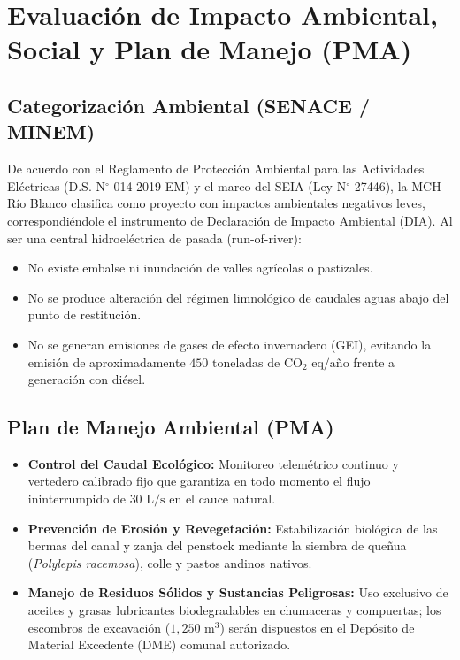 \documentclass[11pt,a4paper]{report}
\begin{document}
\chapter{Evaluación de Impacto Ambiental, Social y Plan de Manejo (PMA)}
\section{Categorización Ambiental (SENACE / MINEM)}
De acuerdo con el Reglamento de Protección Ambiental para las Actividades Eléctricas (D.S. N$^\circ$ 014-2019-EM) y el marco del SEIA (Ley N$^\circ$ 27446), la MCH Río Blanco clasifica como proyecto con impactos ambientales negativos leves, correspondiéndole el instrumento de Declaración de Impacto Ambiental (DIA). Al ser una central hidroeléctrica de pasada (run-of-river):
\begin{itemize}
    \item No existe embalse ni inundación de valles agrícolas o pastizales.
    \item No se produce alteración del régimen limnológico de caudales aguas abajo del punto de restitución.
    \item No se generan emisiones de gases de efecto invernadero (GEI), evitando la emisión de aproximadamente $450\text{ toneladas de CO}_2\text{ eq/año}$ frente a generación con diésel.
\end{itemize}

\section{Plan de Manejo Ambiental (PMA)}
\begin{itemize}
    \item \textbf{Control del Caudal Ecológico:} Monitoreo telemétrico continuo y vertedero calibrado fijo que garantiza en todo momento el flujo ininterrumpido de $30\text{ L/s}$ en el cauce natural.
    \item \textbf{Prevención de Erosión y Revegetación:} Estabilización biológica de las bermas del canal y zanja del penstock mediante la siembra de queñua (\textit{Polylepis racemosa}), colle y pastos andinos nativos.
    \item \textbf{Manejo de Residuos Sólidos y Sustancias Peligrosas:} Uso exclusivo de aceites y grasas lubricantes biodegradables en chumaceras y compuertas; los escombros de excavación ($1,250\text{ m}^3$) serán dispuestos en el Depósito de Material Excedente (DME) comunal autorizado.
\end{itemize}
\end{document}
